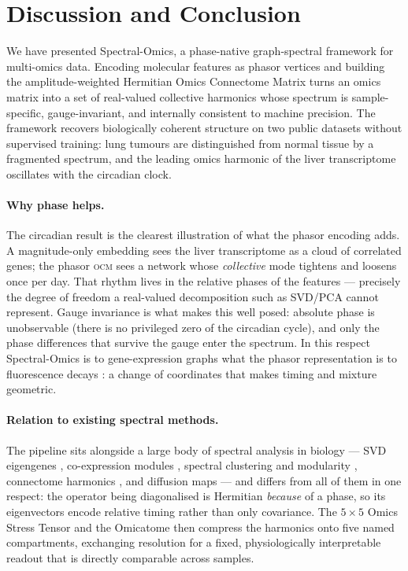\documentclass[preprint,12pt,amsmath,amssymb,superscriptaddress,floatfix]{revtex4-2}
\theoremstyle{definition}
\theoremstyle{plain}
\newcommand{\OCM}{\textsc{ocm}}
\begin{document}
\FloatBarrier

\section{Discussion and Conclusion}
\label{sec:conclusion}

We have presented Spectral-Omics, a phase-native graph-spectral framework for
multi-omics data. Encoding molecular features as phasor vertices and building the
amplitude-weighted Hermitian Omics Connectome Matrix turns an omics matrix into a
set of real-valued collective harmonics whose spectrum is sample-specific,
gauge-invariant, and internally consistent to machine precision. The framework
recovers biologically coherent structure on two public datasets without
supervised training: lung tumours are distinguished from normal tissue by a
fragmented spectrum, and the leading omics harmonic of the liver transcriptome
oscillates with the circadian clock.

\paragraph{Why phase helps.}
The circadian result is the clearest illustration of what the phasor encoding
adds. A magnitude-only embedding sees the liver transcriptome as a cloud of
correlated genes; the phasor \OCM{} sees a network whose \emph{collective} mode
tightens and loosens once per day. That rhythm lives in the relative phases of
the features --- precisely the degree of freedom a real-valued decomposition such
as SVD/PCA \citep{alter2000svd} cannot represent. Gauge invariance is what makes
this well posed: absolute phase is unobservable (there is no privileged zero of
the circadian cycle), and only the phase differences that survive the gauge enter
the spectrum. In this respect Spectral-Omics is to gene-expression graphs what
the phasor representation is to fluorescence decays \citep{digman2008phasor,
stringari2011cell}: a change of coordinates that makes timing and mixture
geometric.

\paragraph{Relation to existing spectral methods.}
The pipeline sits alongside a large body of spectral analysis in biology --- SVD
eigengenes \citep{alter2000svd}, co-expression modules
\citep{langfelder2008wgcna}, spectral clustering and modularity
\citep{vonluxburg2007tutorial, newman2006modularity}, connectome harmonics
\citep{atasoy2016connectome}, and diffusion maps \citep{haghverdi2015diffusion}
--- and differs from all of them in one respect: the operator being
diagonalised is Hermitian \emph{because} of a phase, so its eigenvectors encode
relative timing rather than only covariance. The $5\times5$ Omics Stress Tensor
and the Omicatome then compress the harmonics onto five named compartments,
exchanging resolution for a fixed, physiologically interpretable readout that is
directly comparable across samples.
\end{document}

